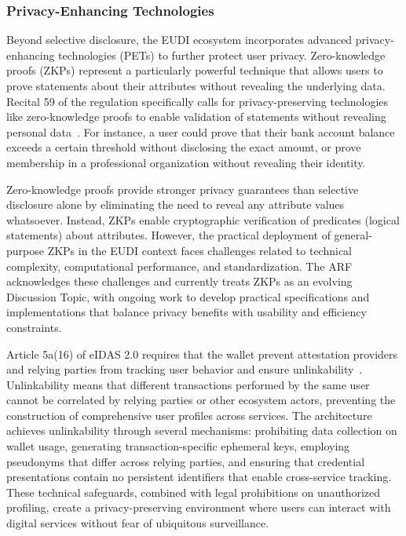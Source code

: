 \documentclass[sigconf,balance,nonacm,authordraft]{acmart}
\begin{document}
\subsubsection{Privacy-Enhancing Technologies}

Beyond selective disclosure, the EUDI ecosystem incorporates advanced privacy-enhancing technologies (PETs) to further protect user privacy. Zero-knowledge proofs (ZKPs) represent a particularly powerful technique that allows users to prove statements about their attributes without revealing the underlying data. Recital 59 of the regulation specifically calls for privacy-preserving technologies like zero-knowledge proofs to enable validation of statements without revealing personal data~\cite{ZKPDiscussion_Recital59}. For instance, a user could prove that their bank account balance exceeds a certain threshold without disclosing the exact amount, or prove membership in a professional organization without revealing their identity.

Zero-knowledge proofs provide stronger privacy guarantees than selective disclosure alone by eliminating the need to reveal any attribute values whatsoever. Instead, ZKPs enable cryptographic verification of predicates (logical statements) about attributes. However, the practical deployment of general-purpose ZKPs in the EUDI context faces challenges related to technical complexity, computational performance, and standardization. The ARF acknowledges these challenges and currently treats ZKPs as an evolving Discussion Topic, with ongoing work to develop practical specifications and implementations that balance privacy benefits with usability and efficiency constraints.

Article 5a(16) of eIDAS 2.0 requires that the wallet prevent attestation providers and relying parties from tracking user behavior and ensure unlinkability~\cite{ZKPDiscussion_Article5a,Potential_PrivacyDesign}. Unlinkability means that different transactions performed by the same user cannot be correlated by relying parties or other ecosystem actors, preventing the construction of comprehensive user profiles across services. The architecture achieves unlinkability through several mechanisms: prohibiting data collection on wallet usage, generating transaction-specific ephemeral keys, employing pseudonyms that differ across relying parties, and ensuring that credential presentations contain no persistent identifiers that enable cross-service tracking. These technical safeguards, combined with legal prohibitions on unauthorized profiling, create a privacy-preserving environment where users can interact with digital services without fear of ubiquitous surveillance.
\end{document}
